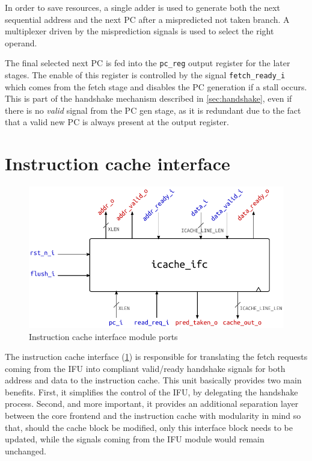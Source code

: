In order to save resources, a single adder is used to generate both the next sequential address and the next \ac{PC} after a mispredicted not taken branch. A multiplexer driven by the misprediction signals is used to select the right operand.

The final selected next \ac{PC} is fed into the \texttt{pc\_reg} output register for the later stages. The enable of this register is controlled by the signal \texttt{fetch\_ready\_i} which comes from the fetch stage and disables the \ac{PC} generation if a stall occurs. This is part of the handshake mechanism described in \cref{sec:handshake}, even if there is no \emph{valid} signal from the \ac{PC} gen stage, as it is redundant due to the fact that a valid new \ac{PC} is always present at the output register.

\section{Instruction cache interface}
\begin{figure}[hbt]
  \centering
  \includegraphics{img/icache_ifc.pdf}
  \caption{Instruction cache interface module ports}
  \label{fig:icache_ifc}
\end{figure}
The instruction cache interface (\cref{fig:icache_ifc}) is responsible for translating the fetch requests coming from the \ac{IFU} into compliant valid/ready handshake signals for both address and data to the instruction cache. This unit basically provides two main benefits. First, it simplifies the control of the \ac{IFU}, by delegating the handshake process. Second, and more important, it provides an additional separation layer between the core frontend and the instruction cache with modularity in mind so that, should the cache block be modified, only this interface block needs to be updated, while the signals coming from the \ac{IFU} module would remain unchanged.

